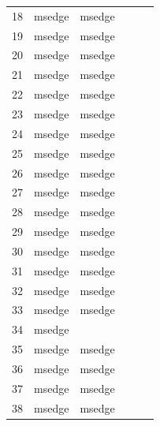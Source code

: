 \documentclass[a4paper,twoside,12pt]{book}
\begin{document}
\begin{appendices}
\begin{table}
\begin{tabular}{llllll}
		18  &  msedge &         msedge &                &                &                \\
		19  &  msedge &         msedge &                &                &                \\
		20  &  msedge &         msedge &                &                &                \\
		21  &  msedge &         msedge &                &                &                \\
		22  &  msedge &         msedge &                &                &                \\
		23  &  msedge &         msedge &                &                &                \\
		24  &  msedge &         msedge &                &                &                \\
		25  &  msedge &         msedge &                &                &                \\
		26  &  msedge &         msedge &                &                &                \\
		27  &  msedge &         msedge &                &                &                \\
		28  &  msedge &         msedge &                &                &                \\
		29  &  msedge &         msedge &                &                &                \\
		30  &  msedge &         msedge &                &                &                \\
		31  &  msedge &         msedge &                &                &                \\
		32  &  msedge &         msedge &                &                &                \\
		33  &  msedge &         msedge &                &                &                \\
		34  &  msedge &                &                &                &                \\
		35  &  msedge &         msedge &                &                &                \\
		36  &  msedge &         msedge &                &                &                \\
		37  &  msedge &         msedge &                &                &                \\
		38  &  msedge &         msedge &                &                &                \\

\end{tabular}
\end{table}
\end{appendices}
\end{document}

